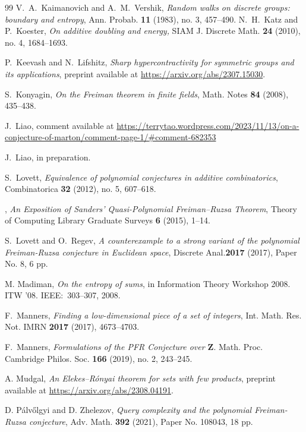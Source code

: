 \documentclass[12pt,reqno,tbtags]{amsart}
\theoremstyle{definition}
\theoremstyle{remark}
\def\Z{\mathbf{Z}}
\numberwithin{equation}{section}
\begin{document}
\begin{thebibliography}{99}
   V.~A.~Kaimanovich and A.~M.~Vershik, \emph{Random walks on discrete groups: boundary and entropy}, Ann. Probab. \textbf{11} (1983), no. 3, 457--490.
   N.~H.~Katz and P.~Koester, \emph{On additive doubling and energy,} SIAM J. Discrete Math. \textbf{24} (2010), no. 4, 1684--1693.

 P.~Keevash and N.~Lifshitz, \emph{Sharp hypercontractivity for symmetric groups and its applications}, preprint available at \url{https://arxiv.org/abs/2307.15030}.


S.~Konyagin, \emph{On the Freiman theorem in finite fields}, Math. Notes \textbf{84} (2008), 435--438.

  J.~Liao, comment available at \url{https://terrytao.wordpress.com/2023/11/13/on-a-conjecture-of-marton/comment-page-1/\#comment-682353}

  J.~Liao, in preparation.

S.~Lovett, \emph{Equivalence of polynomial conjectures in additive combinatorics},
Combinatorica \textbf{32} (2012), no. 5, 607--618.

\bysame, \emph{An Exposition of Sanders' Quasi-Polynomial Freiman--Ruzsa Theorem}, Theory of Computing Library Graduate Surveys \textbf{6} (2015), 1--14.

S.~Lovett and O.~Regev, \emph{A counterexample to a strong variant of the polynomial Freiman-Ruzsa conjecture in Euclidean space}, Discrete Anal.\textbf{2017} (2017), Paper No. 8, 6 pp.

M. Madiman, \emph{On the entropy of sums}, in Information Theory Workshop 2008. ITW '08.  IEEE:\ 303--307, 2008.

F.~Manners, \emph{Finding a low-dimensional piece of a set of integers}, Int. Math. Res. Not. IMRN \textbf{2017} (2017), 4673--4703.

 F.~Manners, \emph{Formulations of the PFR Conjecture over $\Z$}. Math. Proc. Cambridge Philos. Soc. \textbf{166} (2019), no. 2, 243--245.

A. Mudgal, \emph{An Elekes--R\'onyai theorem for sets with few products}, preprint available at \url{https://arxiv.org/abs/2308.04191}.

D.  P\'alv\H{o}lgyi and D. Zhelezov, \emph{Query complexity and the polynomial Freiman-Ruzsa conjecture},
Adv. Math. \textbf{392} (2021), Paper No. 108043, 18 pp.


\end{thebibliography}
\end{document}
